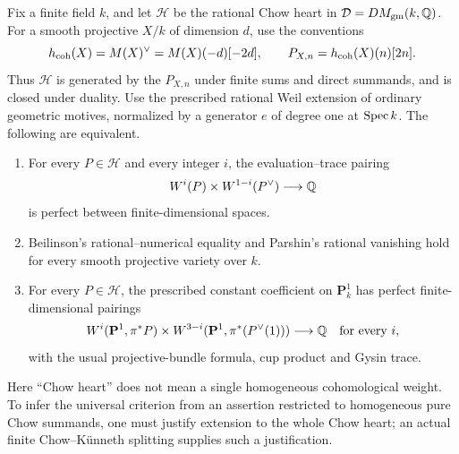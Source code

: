 \begin{proposition}
\label{prop:B-finite-field-coefficient-gate}
Fix a finite field \(k\), and let \(\mathcal H\) be the rational Chow
heart in \(\mathcal D=DM_{\rm gm}(k,\mathbb Q)\).  For a smooth projective
\(X/k\) of dimension \(d\), use the conventions
\[
 h_{\rm coh}(X)=M(X)^\vee=M(X)(-d)[-2d],\qquad
 P_{X,n}=h_{\rm coh}(X)(n)[2n].
\]
Thus \(\mathcal H\) is generated by the \(P_{X,n}\) under finite sums
and direct summands, and is closed under duality.  Use the prescribed
rational Weil extension of ordinary geometric motives, normalized by
a generator \(e\) of degree one at \(\operatorname{Spec} k\).  The following are
equivalent.
\begin{enumerate}
\item For every \(P\in\mathcal H\) and every integer \(i\), the
evaluation--trace pairing
\[
 W^i(P)\times W^{1-i}(P^\vee)\longrightarrow\mathbb Q
\]
is perfect between finite-dimensional spaces.
\item Beilinson's rational--numerical equality and Parshin's rational
vanishing hold for every smooth projective variety over \(k\).
\item For every \(P\in\mathcal H\), the prescribed constant coefficient
on \(\mathbf P^1_k\) has perfect finite-dimensional pairings
\[
 W^i(\mathbf P^1,\pi^*P)\times
 W^{3-i}(\mathbf P^1,\pi^*(P^\vee(1)))\longrightarrow\mathbb Q
 \quad\text{for every }i,
\]
with the usual projective-bundle formula, cup product and Gysin trace.
\end{enumerate}
Here ``Chow heart'' does not mean a single homogeneous cohomological
weight.  To infer the universal criterion from an assertion restricted
to homogeneous pure Chow summands, one must justify extension to the
whole Chow heart; an actual finite Chow--K\"unneth splitting supplies
such a justification.
\end{proposition}
